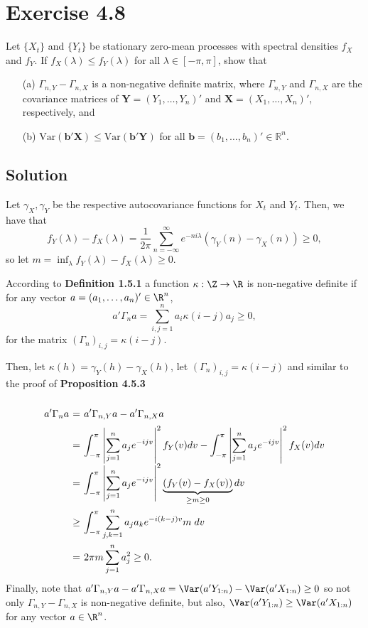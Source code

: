 \section*{Exercise 4.8}

Let \(\{X_t\}\) and \(\{Y_t\}\) be stationary zero-mean processes with spectral densities \(f_X\) 
and \(f_Y\). If \(f_X(\lambda) \leq f_Y(\lambda)\) for all \(\lambda \in [-\pi, \pi]\), show that 
\begin{itemize}
    \item[(a)] \(\Gamma_{n,Y} - \Gamma_{n,X}\) is a non-negative definite matrix, where \(\Gamma_{n,Y}\) and 
    \(\Gamma_{n,X}\) are the covariance matrices of \(\mathbf{Y} = (Y_1, \ldots, Y_n)'\) and 
    \(\mathbf{X} = (X_1, \ldots, X_n)'\), respectively, and
    \item[(b)] \(\mathrm{Var}(\mathbf{b}'\mathbf{X}) \leq \mathrm{Var}(\mathbf{b}'\mathbf{Y})\) 
    for all \(\mathbf{b} = (b_1, \ldots, b_n)' \in \mathbb{R}^n\).
\end{itemize}

\subsection*{Solution}

Let $\gamma_X,\gamma_Y$ be the respective autocovariance functions for $X_t$ and $Y_t$. Then, we have that
\[ f_Y(\lambda) - f_X(\lambda) = \frac{1}{2\pi} \sum_{n = -\infty}^{\infty} e^{-ni\lambda} (\gamma_Y(n)-\gamma_X(n)) \geq 0, \]
so let $m = \inf_{\lambda} f_Y(\lambda) - f_X(\lambda) \geq 0$.

According to \textbf{Definition 1.5.1} a function $\kappa: \Z \to \R$ is non-negative definite if for any vector $a = (a_1,\ldots, a_n)' \in \R^n$,
\[ a'\Gamma_n a = \sum_{i,j = 1}^{n} a_i \kappa(i-j) a_j \geq 0, \]
for the matrix $(\Gamma_n)_{i,j} = \kappa(i-j)$.

Then, let $\kappa(h) = \gamma_Y(h)-\gamma_X(h)$, let $(\Gamma_n)_{i,j} = \kappa(i-j)$ and similar to the proof of \textbf{Proposition 4.5.3}
\[ \everymath{\displaystyle}
\arraycolsep=1.8pt\def\arraystretch{2.5}
\begin{array}{rcl}
    a'\Gamma_n a & = & a' \Gamma_{n,Y} a - a' \Gamma_{n,X} a\\
    & = & \int_{-\pi}^{\pi} \left|  \sum_{j = 1}^n a_j e^{-ijv} \right|^2 f_Y(v) dv - \int_{-\pi}^{\pi} \left|  \sum_{j = 1}^n a_j e^{-ijv} \right|^2 f_X(v) dv\\
    & = & \int_{-\pi}^{\pi} \left|  \sum_{j = 1}^n a_j e^{-ijv} \right|^2 \underbrace{(f_Y(v)-f_X(v))}_{\geq m \geq 0} dv\\
    & \geq & \int_{-\pi}^{\pi} \sum_{j,k = 1}^n a_j a_k e^{-i(k-j)v} m\; d v\\
    & = & 2\pi m \sum_{j = 1}^n a_j^2 \geq 0.
\end{array}\]
Finally, note that $a' \Gamma_{n,Y} a - a' \Gamma_{n,X} a = \Var(a' Y_{1:n}) - \Var(a' X_{1:n}) \geq 0$ so not only $\Gamma_{n,Y} - \Gamma_{n,X}$ is non-negative definite, but also, $\Var(a' Y_{1:n}) \geq \Var(a' X_{1:n})$ for any vector $a \in \R^n$.